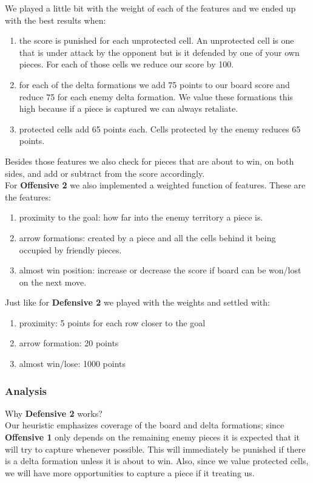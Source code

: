 \documentclass[11pt]{article}
\begin{document}
We played a little bit with the weight of each of the features and we ended up with the best results when:
\begin{enumerate}
\item the score is punished for each unprotected cell. An unprotected cell is one that is under attack by the opponent but is it defended by one of your own pieces. For each of those cells we reduce our score by 100.
\item for each of the delta formations we add 75 points to our board score and reduce 75 for each enemy delta formation. We value these formations this high because if a piece is captured we can always retaliate.
\item protected cells add 65 points each. Cells protected by the enemy reduces 65 points.
\end{enumerate}

Besides those features we also check for pieces that are about to win, on both sides, and add or subtract from the score accordingly.\\

For \textbf{Offensive 2} we also implemented a weighted function of features. These are the features:
\begin{enumerate}
\item proximity to the goal: how far into the enemy territory a piece is.
\item arrow formations: created by a piece and all the cells behind it being occupied by friendly pieces.
\item almost win position: increase or decrease the score if board can be won/lost on the next move.
\end{enumerate}

Just like for \textbf{Defensive 2} we played with the weights and settled with:
\begin{enumerate}
\item proximity: 5 points for each row closer to the goal
\item arrow formation: 20 points
\item almost win/lose: 1000 points
\end{enumerate}

\subsubsection*{Analysis}
Why \textbf{Defensive 2} works?\\
Our heuristic emphasizes coverage of the board and delta formations; since \textbf{Offensive 1} only depends on the remaining enemy pieces it is expected that it will try to capture whenever possible. This will immediately be punished if there is a delta formation unless it is about to win. Also, since we value protected cells, we will have more opportunities to capture a piece if it treating us.\\
\end{document}
